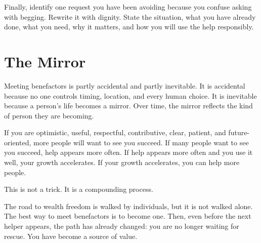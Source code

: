 Finally, identify one request you have been avoiding because you confuse asking with begging. Rewrite it with dignity. State the situation, what you have already done, what you need, why it matters, and how you will use the help responsibly.

\section*{The Mirror}

Meeting benefactors is partly accidental and partly inevitable. It is accidental because no one controls timing, location, and every human choice. It is inevitable because a person's life becomes a mirror. Over time, the mirror reflects the kind of person they are becoming.

If you are optimistic, useful, respectful, contributive, clear, patient, and future-oriented, more people will want to see you succeed. If many people want to see you succeed, help appears more often. If help appears more often and you use it well, your growth accelerates. If your growth accelerates, you can help more people.

This is not a trick. It is a compounding process.

The road to wealth freedom is walked by individuals, but it is not walked alone. The best way to meet benefactors is to become one. Then, even before the next helper appears, the path has already changed: you are no longer waiting for rescue. You have become a source of value.
